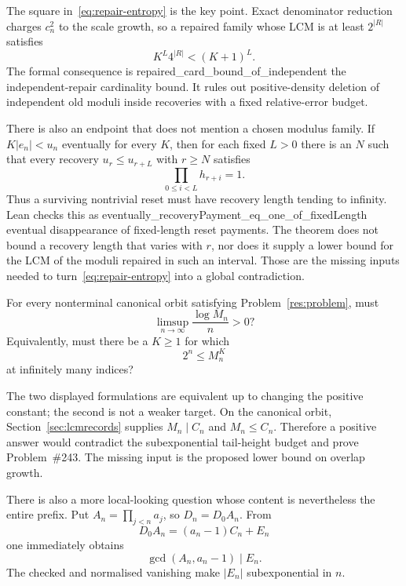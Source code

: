 \documentclass[11pt]{article}
\begin{document}
The square in~\eqref{eq:repair-entropy} is the key point.  Exact denominator
reduction charges $c_n^2$ to the scale growth, so a repaired family whose LCM
is at least $2^{|R|}$ satisfies
\[
 K^L4^{|R|}<(K+1)^L.
\]
The formal consequence is
      {repaired_card_bound_of_independent}
      {the independent-repair cardinality bound}.
It rules out positive-density deletion of independent old moduli inside
recoveries with a fixed relative-error budget.

There is also an endpoint that does not mention a chosen modulus family.  If
$K|e_n|<u_n$ eventually for every $K$, then for each fixed $L>0$ there is an
$N$ such that every recovery $u_r\le u_{r+L}$ with $r\ge N$ satisfies
\[
 \prod_{0\le i<L}h_{r+i}=1.
\]
Thus a surviving nontrivial reset must have recovery length tending to
infinity.  Lean checks this as
      {eventually_recoveryPayment_eq_one_of_fixedLength}
      {eventual disappearance of fixed-length reset payments}.
The theorem does not bound a recovery length that varies with $r$, nor does it
supply a lower bound for the LCM of the moduli repaired in such an interval.
Those are the missing inputs needed to turn~\eqref{eq:repair-entropy} into a
global contradiction.

\begin{problem}\label{res:lcmheight}
For every nonterminal canonical orbit satisfying Problem~\ref{res:problem},
must
\[
 \limsup_{n\to\infty}\frac{\log M_n}{n}>0?
\]
Equivalently, must there be a $K\ge1$ for which
\[
 2^n\le M_n^K
\]
at infinitely many indices?
\end{problem}

\noindent The two displayed formulations are equivalent up to changing the
positive constant; the second is not a weaker target. On the canonical orbit,
Section~\ref{sec:lcmrecords} supplies $M_n\mid C_n$ and $M_n\le C_n$.
Therefore a positive answer would contradict the subexponential tail-height
budget and prove Problem~\#243. The missing input is the proposed lower
bound on overlap growth.

There is also a more local-looking question whose content is nevertheless the
entire prefix.  Put $A_n=\prod_{j<n}a_j$, so $D_n=D_0A_n$.  From
\[
 D_0A_n=(a_n-1)C_n+E_n
\]
one immediately obtains
\[
 \gcd(A_n,a_n-1)\mid E_n.
\]
The checked
and normalised vanishing make $|E_n|$ subexponential in $n$.
\end{document}

